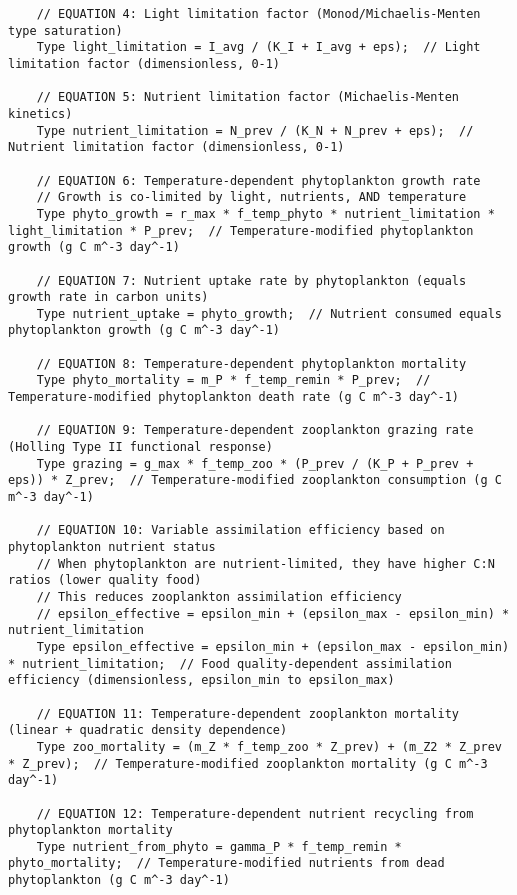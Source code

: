 \begin{lstlisting}
    // EQUATION 4: Light limitation factor (Monod/Michaelis-Menten type saturation)
    Type light_limitation = I_avg / (K_I + I_avg + eps);  // Light limitation factor (dimensionless, 0-1)
    
    // EQUATION 5: Nutrient limitation factor (Michaelis-Menten kinetics)
    Type nutrient_limitation = N_prev / (K_N + N_prev + eps);  // Nutrient limitation factor (dimensionless, 0-1)
    
    // EQUATION 6: Temperature-dependent phytoplankton growth rate
    // Growth is co-limited by light, nutrients, AND temperature
    Type phyto_growth = r_max * f_temp_phyto * nutrient_limitation * light_limitation * P_prev;  // Temperature-modified phytoplankton growth (g C m^-3 day^-1)
    
    // EQUATION 7: Nutrient uptake rate by phytoplankton (equals growth rate in carbon units)
    Type nutrient_uptake = phyto_growth;  // Nutrient consumed equals phytoplankton growth (g C m^-3 day^-1)
    
    // EQUATION 8: Temperature-dependent phytoplankton mortality
    Type phyto_mortality = m_P * f_temp_remin * P_prev;  // Temperature-modified phytoplankton death rate (g C m^-3 day^-1)
    
    // EQUATION 9: Temperature-dependent zooplankton grazing rate (Holling Type II functional response)
    Type grazing = g_max * f_temp_zoo * (P_prev / (K_P + P_prev + eps)) * Z_prev;  // Temperature-modified zooplankton consumption (g C m^-3 day^-1)
    
    // EQUATION 10: Variable assimilation efficiency based on phytoplankton nutrient status
    // When phytoplankton are nutrient-limited, they have higher C:N ratios (lower quality food)
    // This reduces zooplankton assimilation efficiency
    // epsilon_effective = epsilon_min + (epsilon_max - epsilon_min) * nutrient_limitation
    Type epsilon_effective = epsilon_min + (epsilon_max - epsilon_min) * nutrient_limitation;  // Food quality-dependent assimilation efficiency (dimensionless, epsilon_min to epsilon_max)
    
    // EQUATION 11: Temperature-dependent zooplankton mortality (linear + quadratic density dependence)
    Type zoo_mortality = (m_Z * f_temp_zoo * Z_prev) + (m_Z2 * Z_prev * Z_prev);  // Temperature-modified zooplankton mortality (g C m^-3 day^-1)
    
    // EQUATION 12: Temperature-dependent nutrient recycling from phytoplankton mortality
    Type nutrient_from_phyto = gamma_P * f_temp_remin * phyto_mortality;  // Temperature-modified nutrients from dead phytoplankton (g C m^-3 day^-1)
    

\end{lstlisting}
